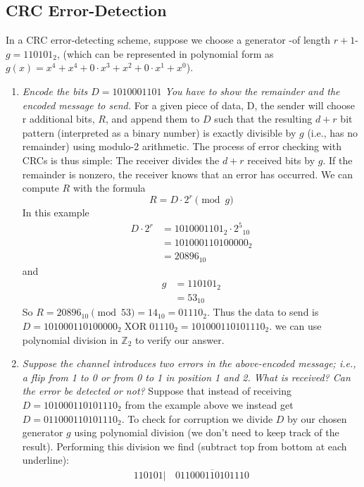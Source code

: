 \documentclass{article}
\begin{document}
\subsection*{CRC Error-Detection}
In a CRC error-detecting scheme, suppose we choose a generator -of length $r+1$- $g = 110101_{2}$, (which can be represented in polynomial form as $g(x) = x^4 + x^4 + 0 \cdot x^3 + x^2 + 0 \cdot x^1 + x^0 $).
\begin{enumerate}
    \item {\it Encode the bits $D = 1010001101$ You have to show the remainder and the encoded message to send.} For a given piece of data, D, the sender will choose r additional bits, $R$, and append them to $D$ such that the resulting $d + r$ bit pattern (interpreted as a binary number) is exactly divisible by $g$ (i.e., has no remainder) using modulo-2 arithmetic. The process of error checking with CRCs is thus simple: The receiver divides the $d + r$ received bits by $g$. If the remainder is nonzero, the receiver knows that an error has occurred. We can compute $R$ with the formula
    \[
        R = D \cdot 2^r \pmod{g}
    \]
    In this example
    \begin{align*}
        D \cdot 2^r &= 1010001101_{2} \cdot {2^5}_{10} \\
        &= 101000110100000_{2} \\
        &= 20896_{10}
    \end{align*}
    and
    \begin{align*}
        g &= 110101_{2} \\
        &= 53_{10}
    \end{align*}
    So $R = 20896_{10} \pmod{53} = 14_{10} = 01110_{2}$. Thus the data to send is $D = 101000110100000_{2} \; \text{XOR} \; 01110_{2} = 101000110101110_2$. we can use polynomial division in $\mathbb{Z}_2$ to verify our answer.
    \item {\it Suppose the channel introduces two errors in the above-encoded message; i.e., a flip from 1 to 0 or from 0 to 1 in position 1 and 2. What is received? Can the error be detected or not?} Suppose that instead of receiving $D = 101000110101110_2$ from the example above we instead get $D = 011000110101110_2$. To check for corruption we divide $D$ by our chosen generator $g$ using polynomial division (we don't need to keep track of the result). Performing this division we find (subtract top from bottom at each underline):
    \begin{align*}
        110101 |& \, \overline{011000110101110} \\[-10pt]

\end{align*}
\end{enumerate}
\end{document}
